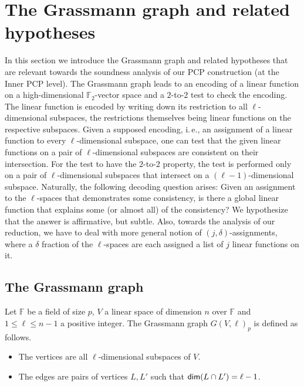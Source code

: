 \documentclass[11pt]{article}
\numberwithin{equation}{section}
\theoremstyle{definition}
\theoremstyle{plain}
\newcommand{\ie}{i.\,e.}
\renewcommand\leq{\leqslant}
\begin{document}
\section{The Grassmann graph and related hypotheses}\label{section:grassmann}
In this section we introduce the Grassmann graph and
related hypotheses that are relevant towards the soundness analysis
of our PCP construction (at the Inner PCP level).
The Grassmann graph leads to an encoding of a linear function
on a high-dimensional $\mathbb{F}_2$-vector space and a
$2$-to-$2$ test
%
 to check the encoding. The linear function
is encoded by writing down its restriction to all $\ell$-dimensional subspaces, the restrictions themselves being
linear functions on the respective subspaces.  %
Given a supposed encoding, \ie, an assignment of a linear function to every $\ell$-dimensional
subspace, one can test that the given
linear functions on a pair of $\ell$-dimensional subspaces are consistent
on their intersection. For the test to have the $2$-to-$2$ property, the test is performed only on a pair of $\ell$-dimensional
subspaces that intersect on a $(\ell-1)$-dimensional subspace.
Naturally, the following decoding
%
 question arises: Given an assignment to the $\ell$-spaces that demonstrates some consistency,
is there a global linear function that explains some (or almost all) of the consistency? We hypothesize that the answer
is affirmative, but subtle. Also, towards the analysis of our reduction, we have to deal
with more general notion of $(j,\delta)$-assignments,
%
where a $\delta$ fraction of the $\ell$-spaces are each assigned a list of $j$
linear functions on it.


\subsection{The Grassmann graph}
Let $\mathbb{F}$ be a field of size $p$, $V$ a linear space of dimension $n$ over
$\mathbb{F}$ and $1 \leq \ell \leq n-1$ a positive integer. The Grassmann graph
$G(V,\ell)_p$ is defined as follows. %
\begin{itemize}
\item The vertices are all $\ell$-dimensional subspaces of $V$.
\item The edges are pairs of vertices $L,L'$ such that ${\sf dim}(L\cap L')=\ell - 1$.
\end{itemize}
%
\end{document}
